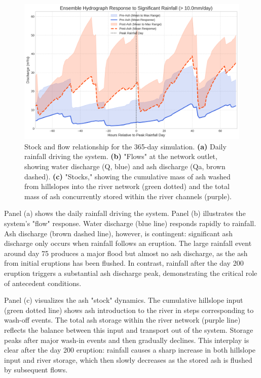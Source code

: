 \documentclass[12pt, a4paper]{article}
\begin{document}
\begin{figure}[H]
    \centering
    \includegraphics[width=1\linewidth]{hydrograph_ensemble.png}
    \caption{Stock and flow relationship for the 365-day simulation. \textbf{(a)} Daily rainfall driving the system. \textbf{(b)} "Flows" at the network outlet, showing water discharge (Q, blue) and ash discharge (Qa, brown dashed). \textbf{(c)} "Stocks," showing the cumulative mass of ash washed from hillslopes into the river network (green dotted) and the total mass of ash concurrently stored within the river channels (purple).}
    \label{fig:hydrograph_ensemble}
\end{figure}


Panel (a) shows the daily rainfall driving the system. Panel (b) illustrates the system's "flow" response. Water discharge (blue line) responds rapidly to rainfall. Ash discharge (brown dashed line), however, is contingent: significant ash discharge only occurs when rainfall follows an eruption. The large rainfall event around day 75 produces a major flood but almost no ash discharge, as the ash from initial eruptions has been flushed. In contrast, rainfall after the day 200 eruption triggers a substantial ash discharge peak, demonstrating the critical role of antecedent conditions.

Panel (c) visualizes the ash "stock" dynamics. The cumulative hillslope input (green dotted line) shows ash introduction to the river in steps corresponding to wash-off events. The total ash storage within the river network (purple line) reflects the balance between this input and transport out of the system. Storage peaks after major wash-in events and then gradually declines. This interplay is clear after the day 200 eruption: rainfall causes a sharp increase in both hillslope input and river storage, which then slowly decreases as the stored ash is flushed by subsequent flows.
\end{document}
